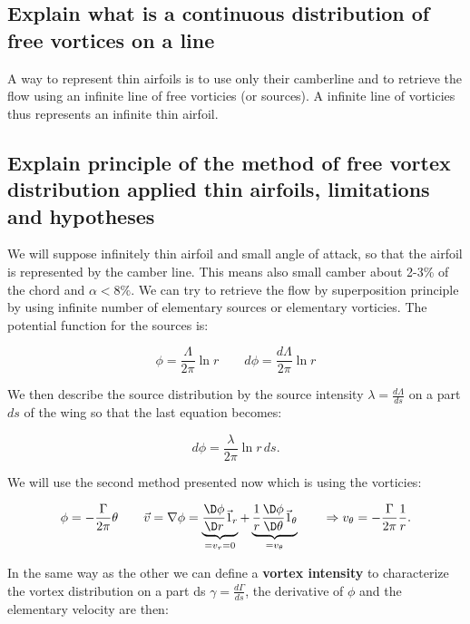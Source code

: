 \documentclass[british,french,11pt, a4paper, openany]{article}
\begin{document}
\subsection{Explain what is a continuous distribution of free vortices on a line}

A way to represent thin airfoils is to use only their camberline and to retrieve the flow using an infinite line of free vorticies (or sources). A infinite line of vorticies thus represents an infinite thin airfoil.

\subsection{Explain principle of the method of free vortex distribution applied thin airfoils, limitations and hypotheses}

We will suppose infinitely thin airfoil and small angle of attack, so that the airfoil is represented by the camber line. This means also small camber about 2-3\% of the chord and $\alpha <8\%$. We can try to retrieve the flow by superposition principle by using infinite number of elementary sources or elementary vorticies. The potential function for the sources is:

\begin{equation}
\phi = \frac{\Lambda}{2\pi} \ln r \qquad d\phi = \frac{d\Lambda}{2\pi} \ln r
\end{equation}		

We then describe the source distribution by the source intensity $\lambda = \frac{d\Lambda}{ds}$ on a part $ds$ of the wing so that the last equation becomes:

\begin{equation}
d\phi = \frac{\lambda}{2\pi} \ln r\, ds.
\end{equation}

We will use the second method presented now which is using the vorticies: 

\begin{equation}
\phi = -\frac{\Gamma}{2\pi} \theta \qquad \vec{v} = \nabla \phi = \underbrace{\frac{\D \phi}{\D r} \vec{1}_r}_{= v_r = 0} + \underbrace{\frac{1}{r} \frac{\D \phi}{\D \theta} \vec{1} _\theta}_{= v_\theta} \qquad \Rightarrow v_\theta = -\frac{\Gamma }{2\pi} \frac{1}{r}.
\end{equation}

In the same way as the other we can define a \textbf{vortex intensity} to characterize the vortex distribution on a part ds $\gamma = \frac{d\Gamma}{ds}$, the derivative of $\phi$ and the elementary velocity are then: 
\end{document}
